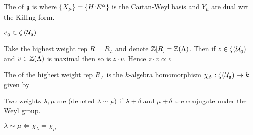 \documentclass{article}
\begin{document}
\begin{definition}
	The  of $\mathfrak{g}$ is 
where $\left\{ X_\mu \right\} = \left\{ H^, E^\alpha \right\}$ is the Cartan-Weyl basis and $Y_\mu$ are dual wrt the Killing form. 
\end{definition}

\begin{lemma}
	$c_{\mathfrak{g}} \in \zeta \left( \mathcal{U}_{\mathfrak{g}} \right)$
\end{lemma}
\begin{lemma}
	Take the highest weight rep $R = R_\Lambda$ and denote $\mathbb{Z}[R] = \mathbb{Z}(\Lambda)$. Then if $z \in \zeta(\mathcal{U}_{\mathfrak{g}})$ and $v \in \mathbb{Z}(\Lambda)$ is maximal then so is $z \cdot v$. Hence $z \cdot v \propto v$
\end{lemma}

\begin{definition}
	The  of the highest weight rep $R_\Lambda$ is the $k$-algebra homomorphism $\chi_\Lambda : \zeta(\mathcal{U}_{\mathfrak{g}}) \to k$ given by 
\end{definition}

\begin{definition}
	Two weights $\lambda,\mu$ are  (denoted $\lambda \sim \mu$) if $\lambda+\delta$ and $\mu+\delta$ are conjugate under the Weyl group.  
\end{definition}

\begin{theorem}
	$\lambda \sim \mu \Leftrightarrow \chi_\lambda = \chi_\mu$
\end{theorem}


\end{document}
